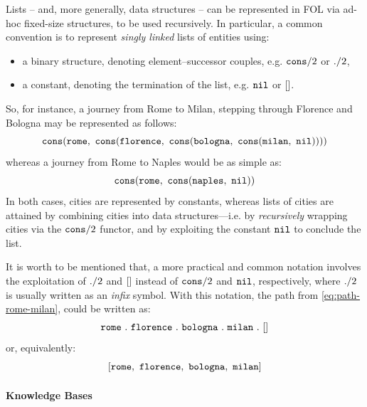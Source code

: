 \documentclass[12pt,a4paper,openright,twoside]{book}
\begin{document}
Lists -- and, more generally, data structures -- can be represented in FOL via ad-hoc fixed-size structures, to be used recursively.
%
In particular, a common convention is to represent \emph{singly linked} lists of entities using:
%
\begin{itemize}
    \item a binary structure, denoting element--successor couples, e.g. $\mathtt{cons}/2$ or $\mathtt{.}/2$,
    \item a constant, denoting the termination of the list, e.g. $\mathtt{nil}$ or $\mathtt{[]}$.
\end{itemize}
%
So, for instance, a journey from Rome to Milan, stepping through Florence and Bologna may be represented as follows:
%
\begin{equation}\label{eq:path-rome-milan}
    \mathtt{cons}(\mathtt{rome},\
        \mathtt{cons}(\mathtt{florence},\
            \mathtt{cons}(\mathtt{bologna},\
                \mathtt{cons}(\mathtt{milan},\
                    \mathtt{nil}
                )
            )
        )
    )
\end{equation}
%
whereas a journey from Rome to Naples would be as simple as:
%
\begin{equation*}
    \mathtt{cons}(\mathtt{rome},\
        \mathtt{cons}(\mathtt{naples},\
            \mathtt{nil}
        )
    )
\end{equation*}
%
In both cases, cities are represented by constants, whereas lists of cities are attained by combining cities into data structures---i.e. by \emph{recursively} wrapping cities via the $\mathtt{cons}/2$ functor, and by exploiting the constant $\mathtt{nil}$ to conclude the list.

It is worth to be mentioned that, a more practical and common notation involves the exploitation of $\mathtt{.}/2$ and $\mathtt{[]}$ instead of $\mathtt{cons}/2$ and $\mathtt{nil}$, respectively, where $\mathtt{.}/2$ is usually written as an \emph{infix} symbol.
%
With this notation, the path from \cref{eq:path-rome-milan}, could be written as:
%
\begin{equation*}
    \mathtt{rome \mathtt{~.~} florence \mathtt{~.~} bologna \mathtt{~.~} milan \mathtt{~.~} []}
\end{equation*}
%
or, equivalently:
%
\begin{equation*}
    \functor{[rome,\ florence,\ bologna,\ milan]}
\end{equation*}

\paragraph{Knowledge Bases}
\end{document}
